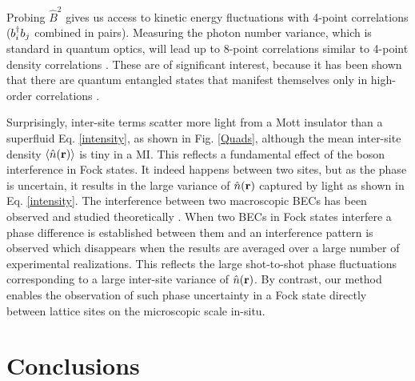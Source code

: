 Probing $\hat{B}^2$ gives us access to kinetic energy fluctuations
with 4-point correlations ($b^\dagger_i b_j$ combined in pairs). Measuring
the photon number variance, which is standard in quantum optics, will
lead up to 8-point correlations similar to 4-point density
correlations \cite{mekhov2007pra}. These are of significant interest,
because it has been shown that there are quantum entangled states that
manifest themselves only in high-order correlations
\cite{kaszlikowski2008}.

Surprisingly, inter-site terms scatter more light from a Mott
insulator than a superfluid Eq. \eqref{intensity}, as shown in
Fig. \eqref{Quads}, although the mean inter-site density
$\langle \hat{n}(\mathbf{r})\rangle $ is tiny in a MI. This reflects a
fundamental effect of the boson interference in Fock states. It indeed
happens between two sites, but as the phase is uncertain, it results
in the large variance of $\hat{n}(\mathbf{r})$ captured by light as shown
in Eq. \eqref{intensity}. The interference between two macroscopic
BECs has been observed and studied theoretically
\cite{horak1999}. When two BECs in Fock states interfere a phase
difference is established between them and an interference pattern is
observed which disappears when the results are averaged over a large
number of experimental realizations. This reflects the large
shot-to-shot phase fluctuations corresponding to a large inter-site
variance of $\hat{n}(\mathbf{r})$. By contrast, our method enables the
observation of such phase uncertainty in a Fock state directly between
lattice sites on the microscopic scale in-situ.

\section{Conclusions}

